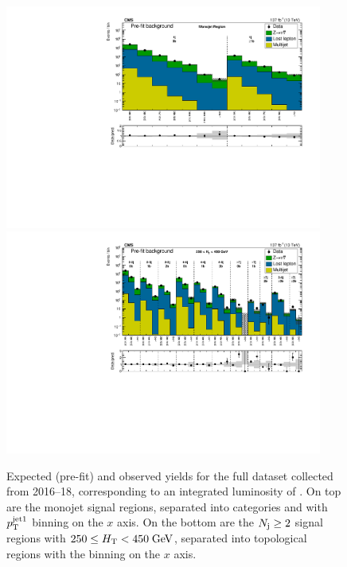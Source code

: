 \begin{figure}[htbp]
  \begin{center}
    \includegraphics[width=0.93\textwidth]{figs/results/prefit_monojet_ratio.pdf} \\
    \includegraphics[width=0.93\textwidth]{figs/results/prefit_HT250to450_ratio.pdf} \\
    \caption{Expected (pre-fit) and observed yields for the full dataset collected from
      2016--18, corresponding to an integrated luminosity of \Lint. On top are the monojet
      signal regions, separated into \Nb categories and with $p_{\mathrm{T}}^{\mathrm{jet1}}$ binning on the $x$ axis.
      On the bottom are the $N_{\mathrm{j}}\geq2$ signal regions with $250 \leq H_{\mathrm{T}} < 450\;\text{Ge\hspace{-.08em}V}$, separated into
      topological regions with the \mttwo binning on the $x$ axis.
            }
    \label{fig:results_mono_vl}
  \end{center}
\end{figure}

